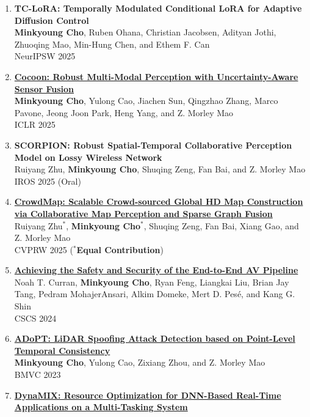 \documentclass[letterpaper,oneside,11pt]{article}
\begin{document}
\begin{enumerate}[leftmargin=*, itemsep=0em]
  CVPRW 2026
  \item \small \textbf{TC-LoRA: Temporally Modulated Conditional LoRA for Adaptive Diffusion Control} \\
  \textbf{Minkyoung Cho}, Ruben Ohana, Christian Jacobsen, Adityan Jothi, Zhuoqing Mao, Min-Hung Chen, and Ethem F. Can \\
  NeurIPSW 2025
  \item \small \textbf{\href{https://openreview.net/pdf?id=DKgAFfCs5F}{Cocoon: Robust Multi-Modal Perception with
  Uncertainty-Aware Sensor Fusion}} \\
  \textbf{Minkyoung Cho}, Yulong Cao, Jiachen Sun, Qingzhao Zhang, Marco Pavone, Jeong Joon Park, Heng Yang, and Z. Morley Mao\\ 
  ICLR 2025 
  \item \small \textbf{SCORPION: Robust Spatial-Temporal Collaborative Perception Model
  on Lossy Wireless Network} \\
  Ruiyang Zhu, \textbf{Minkyoung Cho}, Shuqing Zeng, Fan Bai, and Z. Morley Mao \\
  IROS 2025 (Oral)
  \item \small \textbf{\href{https://ry4nzhu.github.io/publication/scalable_crowded_hd_map_construction/scalable_crowded_HD_map_construction.pdf}{CrowdMap: Scalable Crowd-sourced Global HD Map Construction via Collaborative Map Perception and Sparse Graph Fusion}} \\
  Ruiyang Zhu$^\ast$, \textbf{Minkyoung Cho$^\ast$}, Shuqing Zeng, Fan Bai, Xiang Gao, and Z. Morley Mao \\
  CVPRW 2025  ($^\ast$\textbf{Equal Contribution})
  \item \small \textbf{\href{https://dl.acm.org/doi/abs/10.1145/3689936.3694694}{Achieving the Safety and Security of the End-to-End AV Pipeline}}\\
  Noah T. Curran, \textbf{Minkyoung Cho}, Ryan Feng, Liangkai Liu, Brian Jay Tang, Pedram MohajerAnsari, Alkim Domeke, Mert D. Pesé, and Kang G. Shin\\
  CSCS 2024 
  \item \small \textbf{\href{https://arxiv.org/abs/2310.14504}{ADoPT: LiDAR Spoofing Attack Detection based on Point-Level Temporal Consistency}}\\
  \textbf{Minkyoung Cho}, Yulong Cao, Zixiang Zhou, and Z. Morley Mao\\
  BMVC 2023
  \item \small  \textbf{\href{https://arxiv.org/abs/2302.01568}{DynaMIX: Resource Optimization for DNN-Based Real-Time Applications on a Multi-Tasking System}}\\

\end{enumerate}
\end{document}
